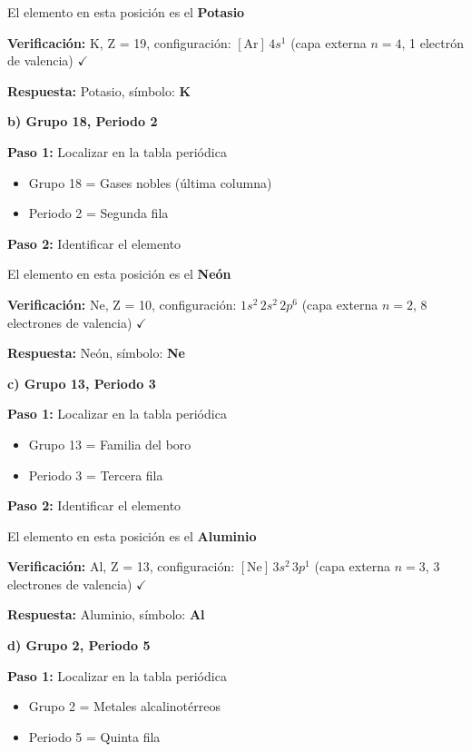 \begin{exercise}
\begin{solu}
        El elemento en esta posición es el \textbf{Potasio}

        \textbf{Verificación:} K, Z = 19, configuración: \([\text{Ar}] \, 4s^1\) (capa externa \(n = 4\), 1 electrón de valencia) \(\checkmark\)

        \textbf{Respuesta:} Potasio, símbolo: \textbf{K}

        \textbf{b) Grupo 18, Periodo 2}

        \textbf{Paso 1:} Localizar en la tabla periódica
        \begin{itemize}
            \item Grupo 18 = Gases nobles (última columna)
            \item Periodo 2 = Segunda fila
        \end{itemize}

        \textbf{Paso 2:} Identificar el elemento

        El elemento en esta posición es el \textbf{Neón}

        \textbf{Verificación:} Ne, Z = 10, configuración: \(1s^2 \, 2s^2 \, 2p^6\) (capa externa \(n = 2\), 8 electrones de valencia) \(\checkmark\)

        \textbf{Respuesta:} Neón, símbolo: \textbf{Ne}

        \textbf{c) Grupo 13, Periodo 3}

        \textbf{Paso 1:} Localizar en la tabla periódica
        \begin{itemize}
            \item Grupo 13 = Familia del boro
            \item Periodo 3 = Tercera fila
        \end{itemize}

        \textbf{Paso 2:} Identificar el elemento

        El elemento en esta posición es el \textbf{Aluminio}

        \textbf{Verificación:} Al, Z = 13, configuración: \([\text{Ne}] \, 3s^2 \, 3p^1\) (capa externa \(n = 3\), 3 electrones de valencia) \(\checkmark\)

        \textbf{Respuesta:} Aluminio, símbolo: \textbf{Al}

        \textbf{d) Grupo 2, Periodo 5}

        \textbf{Paso 1:} Localizar en la tabla periódica
        \begin{itemize}
            \item Grupo 2 = Metales alcalinotérreos
            \item Periodo 5 = Quinta fila
        \end{itemize}


\end{solu}
\end{exercise}
